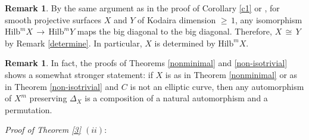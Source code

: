 \documentclass[12pt,reqno]{amsart}
\theoremstyle{definition}
\newtheorem{remark}[lemma]{Remark}
\numberwithin{equation}{section}
\begin{document}
\begin{remark}\label{determine1}
By the same argument as in the proof of Corollary \ref{c1} or {\cite[Theorem 3.3]{Ha}}, for smooth projective surfaces $X$ and $Y$ of Kodaira dimension $\geq\, 1$, any isomorphism $\textrm{Hilb}^{m}X\,\to\, \textrm{Hilb}^{m}Y$ maps the big diagonal to the big diagonal. Therefore, $X\,\cong\, Y$ by Remark \ref{determine}. In particular, $X$ is determined by $\textrm{Hilb}^{m}X$.
\end{remark}
\begin{remark}
    In fact, the proofs of Theorems \ref{nonminimal} and \ref{non-isotrivial} shows a somewhat stronger statement: if $X$ is as in Theorem \ref{nonminimal} or as in Theorem \ref{non-isotrivial} and $C$ is not an elliptic curve, then any automorphism of $X^m$ preserving $\Delta_X$ is a composition of a natural automorphism and a permutation.
\end{remark}
\textit{Proof of Theorem \ref{3} $(ii):$}
\end{document}
